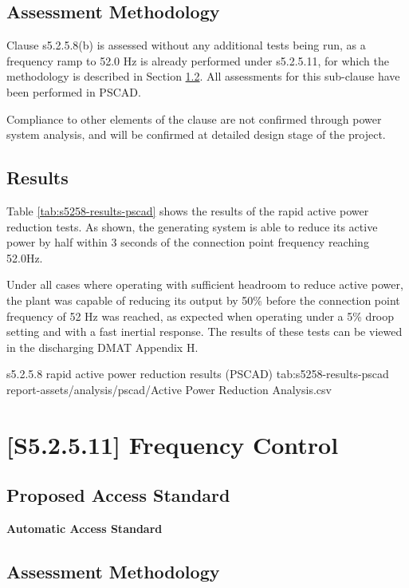 \documentclass{../grid-link-report}
\newcommand{\projectassetsdir}{../project-assets}
\begin{document}
	\subsection{Assessment Methodology}
		Clause s5.2.5.8(b) is assessed without any additional tests being run, as a frequency ramp to 52.0 Hz is already performed under s5.2.5.11, for which the methodology is described in Section \ref{subsec:s52511-assessment-methodology}. All assessments for this sub-clause have been performed in PSCAD.
		
		Compliance to other elements of the clause are not confirmed through power system analysis, and will be confirmed at detailed design stage of the project.
		

	\subsection{Results}
	Table \ref{tab:s5258-results-pscad} shows the results of the rapid active power reduction tests. As shown, the generating system is able to reduce its active power by half within 3 seconds of the connection point frequency reaching 52.0Hz.
	
	Under all cases where operating with sufficient headroom to reduce active power, the plant was capable of reducing its output by 50\% before the connection point frequency of 52 Hz was reached, as expected when operating under a 5\% droop setting and with a fast inertial response. The results of these tests can be viewed in the discharging DMAT Appendix H.
	
		{
			\fontsize{9}{11}\selectfont
			\autoscaledlongtable
			{s5.2.5.8 rapid active power reduction results (PSCAD)}
			{tab:s5258-results-pscad}
			{report-assets/analysis/pscad/Active Power Reduction Analysis.csv}
		}


	\section{[S5.2.5.11] Frequency Control}
	\subsection{Proposed Access Standard}
	\textbf{Automatic Access Standard}
		\begin{tcolorbox}[lightgreenbox]
			
		\end{tcolorbox}
	\subsection{Assessment Methodology}
		\label{subsec:s52511-assessment-methodology}
		
		
\end{document}
